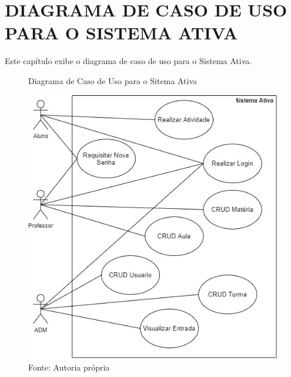 \documentclass{utfpr-pg}
\begin{document}
\chapter{DIAGRAMA DE CASO DE USO PARA O SISTEMA ATIVA}
  \label{chapter:diagrama de cado de uso para o sistema ativa}
  Este capítulo exibe o diagrama de caso de uso para o Sistema Ativa.
    \begin{figure}[H]
            \centering
            \captionsetup{width=0.9\textwidth}
            \caption{Diagrama de Caso de Uso para o Sitema Ativa}
            \includegraphics[width=\linewidth]{fotos/Diagrama.jpg}
            \caption*{Fonte: Autoria própria}
            \label{fig:Diagrama de Caso de Uso}
        \end{figure}
 

\end{document}
